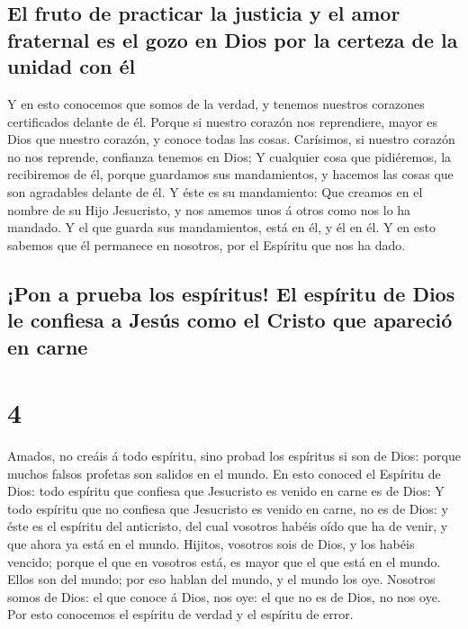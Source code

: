 \hypertarget{el-fruto-de-practicar-la-justicia-y-el-amor-fraternal-es-el-gozo-en-dios-por-la-certeza-de-la-unidad-con-uxe9l}{%
\subsection{El fruto de practicar la justicia y el amor fraternal es el
gozo en Dios por la certeza de la unidad con
él}\label{el-fruto-de-practicar-la-justicia-y-el-amor-fraternal-es-el-gozo-en-dios-por-la-certeza-de-la-unidad-con-uxe9l}}

 Y en esto conocemos que somos de la verdad, y tenemos
nuestros corazones certificados delante de él.  Porque si
nuestro corazón nos reprendiere, mayor es Dios que nuestro corazón, y
conoce todas las cosas.  Carísimos, si nuestro corazón no
nos reprende, confianza tenemos en Dios;  Y cualquier
cosa que pidiéremos, la recibiremos de él, porque guardamos sus
mandamientos, y hacemos las cosas que son agradables delante de él.
 Y éste es su mandamiento: Que creamos en el nombre de su
Hijo Jesucristo, y nos amemos unos á otros como nos lo ha mandado.
 Y el que guarda sus mandamientos, está en él, y él en
él. Y en esto sabemos que él permanece en nosotros, por el Espíritu que
nos ha dado.

\hypertarget{pon-a-prueba-los-espuxedritus-el-espuxedritu-de-dios-le-confiesa-a-jesuxfas-como-el-cristo-que-apareciuxf3-en-carne}{%
\subsection{¡Pon a prueba los espíritus! El espíritu de Dios le confiesa
a Jesús como el Cristo que apareció en
carne}\label{pon-a-prueba-los-espuxedritus-el-espuxedritu-de-dios-le-confiesa-a-jesuxfas-como-el-cristo-que-apareciuxf3-en-carne}}

\hypertarget{section-3}{%
\section{4}\label{section-3}}

 Amados, no creáis á todo espíritu, sino probad los
espíritus si son de Dios: porque muchos falsos profetas son salidos en
el mundo.  En esto conoced el Espíritu de Dios: todo
espíritu que confiesa que Jesucristo es venido en carne es de Dios:
 Y todo espíritu que no confiesa que Jesucristo es venido
en carne, no es de Dios: y éste es el espíritu del anticristo, del cual
vosotros habéis oído que ha de venir, y que ahora ya está en el mundo.
 Hijitos, vosotros sois de Dios, y los habéis vencido;
porque el que en vosotros está, es mayor que el que está en el mundo.
 Ellos son del mundo; por eso hablan del mundo, y el mundo
los oye.  Nosotros somos de Dios: el que conoce á Dios,
nos oye: el que no es de Dios, no nos oye. Por esto conocemos el
espíritu de verdad y el espíritu de error.

